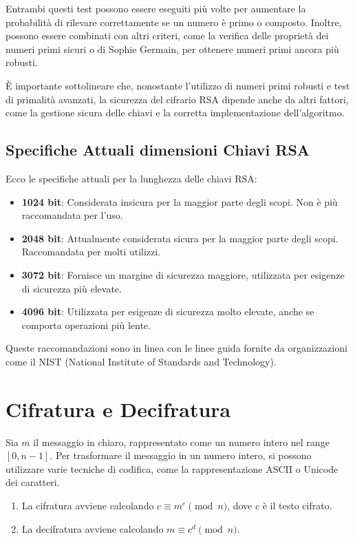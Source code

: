 \documentclass[a4paper,12pt]{report}
\begin{document}
Entrambi questi test possono essere eseguiti più volte per aumentare la probabilità di rilevare correttamente se un numero è primo o composto. Inoltre, possono essere combinati con altri criteri, come la verifica delle proprietà dei numeri primi sicuri o di Sophie Germain, per ottenere numeri primi ancora più robusti.

È importante sottolineare che, nonostante l'utilizzo di numeri primi robusti e test di primalità avanzati, la sicurezza del cifrario RSA dipende anche da altri fattori, come la gestione sicura delle chiavi e la corretta implementazione dell'algoritmo.

\subsection*{Specifiche Attuali dimensioni Chiavi RSA}

Ecco le specifiche attuali per la lunghezza delle chiavi RSA:

\begin{itemize}
    \item \textbf{1024 bit}: Considerata insicura per la maggior parte degli scopi. Non è più raccomandata per l'uso.
    \item \textbf{2048 bit}: Attualmente considerata sicura per la maggior parte degli scopi. Raccomandata per molti utilizzi.
    \item \textbf{3072 bit}: Fornisce un margine di sicurezza maggiore, utilizzata per esigenze di sicurezza più elevate.
    \item \textbf{4096 bit}: Utilizzata per esigenze di sicurezza molto elevate, anche se comporta operazioni più lente.
\end{itemize}

Queste raccomandazioni sono in linea con le linee guida fornite da organizzazioni come il NIST (National Institute of Standards and Technology)\cite{nist}.

\section{Cifratura e Decifratura}
Sia $m$ il messaggio in chiaro, rappresentato come un numero intero nel range $[0, n - 1]$. Per trasformare il messaggio in un numero intero, si possono utilizzare varie tecniche di codifica, come la rappresentazione ASCII o Unicode dei caratteri.

\begin{enumerate}
    \item La cifratura avviene calcolando $c \equiv m^e \pmod{n}$, dove $c$ è il testo cifrato.
    \item La decifratura avviene calcolando $m \equiv c^d \pmod{n}$.
\end{enumerate}
\end{document}
